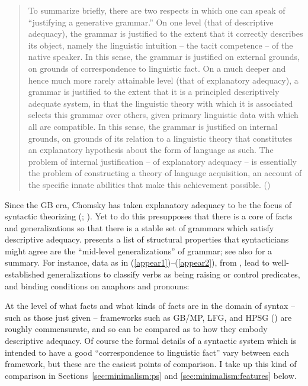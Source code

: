 \documentclass[output=paper,hidelinks]{langscibook}
\begin{document}
\begin{quote}
To summarize briefly, there are two respects
in which one can speak of ``justifying a generative grammar.'' On one
level (that of descriptive adequacy), the grammar is justified to the
extent that it correctly describes its object, namely the linguistic
intuition -- the tacit competence -- of the native speaker. In this
sense, the grammar is justified on external grounds, on grounds of
correspondence to linguistic fact. On a much deeper and hence much
more rarely attainable level (that of explanatory adequacy), a grammar
is justified to the extent that it is a principled descriptively
adequate system, in that the linguistic theory with which it is
associated selects this grammar over others, given primary linguistic
data with which all are compatible. In this sense, the grammar is
justified on internal grounds, on grounds of its relation to a
linguistic theory that constitutes an explanatory hypothesis about the
form of language as such. The problem of internal justification -- of
explanatory adequacy -- is essentially the problem of constructing a
theory of language acquisition, an account of the specific innate
abilities that make this achievement possible.
(\citealp[26--27]{chomsky1965aspects})
\end{quote}

\largerpage
Since the GB era, Chomsky has taken explanatory adequacy to be the
focus of syntactic theorizing (\citealp{rizzi16};
\citealp{dalessandro19}). Yet to do this presupposes that there is a
core of facts and generalizations so that there is a stable set of
grammars which satisfy descriptive adequacy. \citet[55]{hornstein18}
presents a list of structural properties that syntacticians might
agree are the ``mid-level generalizations'' of grammar; see also
\citet[8]{dalessandro19} for a summary. For instance, data as in
(\ref{appear1})--(\ref{appear2}), from
\citet[261]{chomsky1973conditions}, lead to well-established
generalizations to classify verbs as being raising or control
predicates, and binding conditions on anaphors and pronouns:

\ea\label{appear1}
\z \z

\ea\label{appear2}
\z \z

At the level of what facts and what kinds of facts are in the domain
of syntax -- such as those just given -- frameworks such as GB/MP,
LFG, and HPSG (\citealp{pollardsag87, pollard1994head-driven}) are
roughly commensurate, and so can be compared as to how they embody
descriptive adequacy. Of course the formal details of a syntactic
system which is intended to have a good ``correspondence to linguistic
fact'' vary between each framework, but these are the easiest points
of comparison. I take up this kind of comparison in
Sections~\ref{sec:minimalism:ps} and \ref{sec:minimalism:features}
below.
\end{document}

